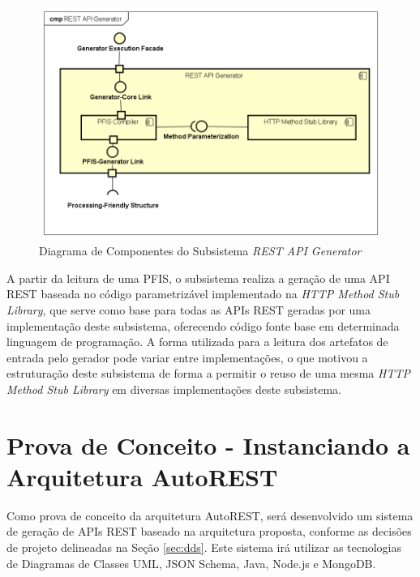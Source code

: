 \begin{figure}[htb]
    \begin{center}
        \includegraphics[scale=0.65]{imagens/REST_API_Generator_Subcomponent_Diagram.png}
    \end{center}
	\caption{\label{fig_gencomp}Diagrama de Componentes do Subsistema \textit{REST API Generator}}
\end{figure}

A partir da leitura de uma PFIS, o subsistema realiza a geração de uma API REST baseada no código parametrizável implementado na \textit{HTTP Method Stub Library}, que serve como base para todas as APIs REST geradas por uma implementação deste subsistema, oferecendo código fonte base em determinada linguagem de programação. A forma utilizada para a leitura dos artefatos de entrada pelo gerador pode variar entre implementações, o que motivou a estruturação deste subsistema de forma a permitir o reuso de uma mesma \textit{HTTP Method Stub Library} em diversas implementações deste subsistema.


\section{Prova de Conceito - Instanciando a Arquitetura AutoREST}
\label{sec:conceptproof}

Como prova de conceito da arquitetura AutoREST, será desenvolvido um sistema de geração de APIs REST baseado na arquitetura proposta, conforme as decisões de projeto delineadas na Seção \ref{sec:dds}. Este sistema irá utilizar as tecnologias de Diagramas de Classes UML, JSON Schema, Java, Node.js e MongoDB.

